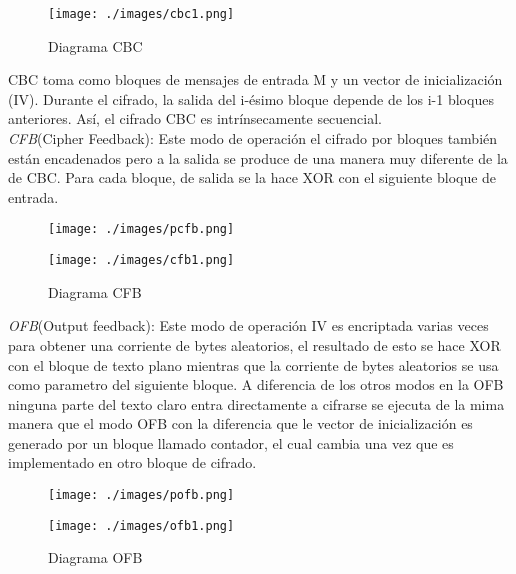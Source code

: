 \documentclass[12pt,oneside,onecolumn,openany]{report}
\begin{document}
\begin{figure}[H]
\centering
	\texttt{[image: ./images/cbc1.png]}
	\caption{Diagrama CBC}
	\label{fig:1-4-1}
\end{figure}
CBC toma como bloques de mensajes de entrada M y un vector de inicialización (IV). Durante el cifrado, la salida del i-ésimo bloque depende de los i-1 bloques anteriores. Así, el cifrado CBC es intrínsecamente secuencial.\\

\textit{CFB}(Cipher Feedback): Este modo de operación el cifrado por bloques también están encadenados pero a la salida se produce de una manera muy diferente de la de CBC. Para cada bloque, de salida se la hace XOR con el siguiente bloque de entrada.\\
\begin{figure}[H]
\centering
	\texttt{[image: ./images/pcfb.png]}
	
\end{figure}
\begin{figure}[H]
\centering
	\texttt{[image: ./images/cfb1.png]}
	\caption{Diagrama CFB}
	\label{fig:1-5-1}
\end{figure}


\textit{OFB}(Output feedback): Este modo de operación IV es encriptada varias veces para obtener una corriente de bytes aleatorios, el resultado de esto se hace XOR con el bloque de texto plano mientras que la corriente de bytes aleatorios se usa como parametro del siguiente bloque. A diferencia de los otros modos en la OFB ninguna parte del texto claro entra directamente a cifrarse  se ejecuta de la mima manera que el modo OFB con la diferencia que le vector de inicialización es generado por un bloque llamado contador, el cual cambia una vez que es implementado en otro bloque de cifrado.
\begin{figure}[H]
\centering
	\texttt{[image: ./images/pofb.png]}
	
\end{figure}
\begin{figure}[H]
\centering
	\texttt{[image: ./images/ofb1.png]}
	\caption{Diagrama OFB}
	\label{fig:1-6-1}
\end{figure}
\end{document}
